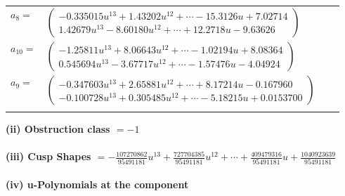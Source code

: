 \documentclass[1p]{elsarticle_modified}
\theoremstyle{definition}
\begin{document}
\begin{tabular}{m{7pt} m{180pt} m{7pt} m{180pt} }
\flushright $a_{8}=$&$\begin{pmatrix}-0.335015 u^{13}+1.43202 u^{12}+\cdots-15.3126 u+7.02714\\1.42679 u^{13}-8.60180 u^{12}+\cdots+12.2718 u-9.63626\end{pmatrix}$ \\
\flushright $a_{10}=$&$\begin{pmatrix}-1.25811 u^{13}+8.06643 u^{12}+\cdots-1.02194 u+8.08364\\0.545694 u^{13}-3.67717 u^{12}+\cdots-1.57476 u-4.04924\end{pmatrix}$ \\
\flushright $a_{9}=$&$\begin{pmatrix}-0.347603 u^{13}+2.65881 u^{12}+\cdots+8.17214 u-0.167960\\-0.100728 u^{13}+0.305485 u^{12}+\cdots-5.18215 u+0.0153700\end{pmatrix}$\\&\end{tabular}
\flushleft \textbf{(ii) Obstruction class $= -1$}\\~\\
\flushleft \textbf{(iii) Cusp Shapes $= -\frac{107270862}{95491181} u^{13}+\frac{727704385}{95491181} u^{12}+\cdots+\frac{409479316}{95491181} u+\frac{1040923639}{95491181}$}\\~\\
\newpage\renewcommand{\arraystretch}{1}
\flushleft \textbf{(iv) u-Polynomials at the component}\newline \\
\end{document}

